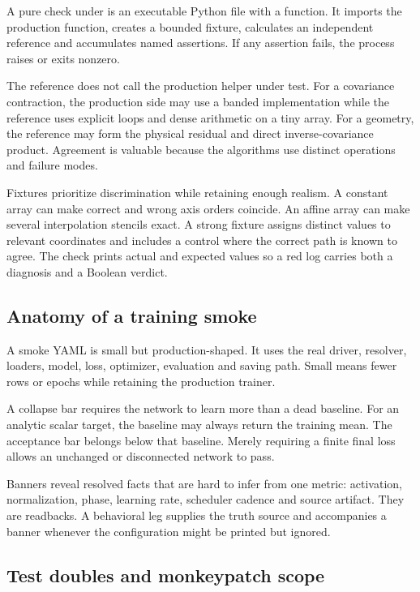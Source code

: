 A pure check under  is an executable Python file with a
 function.  It imports the production function, creates a bounded
fixture, calculates an independent reference and accumulates named
assertions.  If any assertion fails, the process raises or exits nonzero.

The reference does not call the production helper under test.  For a
covariance contraction, the production side may use a banded implementation
while the reference uses explicit loops and dense arithmetic on a tiny array.
For a geometry, the reference may form the physical residual and direct
inverse-covariance product.  Agreement is valuable because the algorithms use
distinct operations and failure modes.

Fixtures prioritize discrimination while retaining enough realism.  A
constant array can make correct and wrong axis orders coincide.  An affine
array can make several interpolation stencils exact.  A strong fixture assigns
distinct values to relevant coordinates and includes a control where the
correct path is known to agree.  The check prints actual and expected values
so a red log carries both a diagnosis and a Boolean verdict.

\subsection{Anatomy of a training smoke}

A smoke YAML is small but production-shaped.  It uses the real driver,
resolver, loaders, model, loss, optimizer, evaluation and saving path.  Small
means fewer rows or epochs while retaining the production trainer.

A collapse bar requires the network to learn more than a dead baseline.  For
an analytic scalar target, the baseline may always return the training mean.
The acceptance bar belongs below that baseline.  Merely requiring a finite
final loss allows an unchanged or disconnected network to pass.

Banners reveal resolved facts that are hard to infer from one metric:
activation, normalization, phase, learning rate, scheduler cadence and source
artifact.  They are readbacks.  A behavioral leg supplies the truth source and accompanies
a banner whenever the configuration might be printed but ignored.

\subsection{Test doubles and monkeypatch scope}

